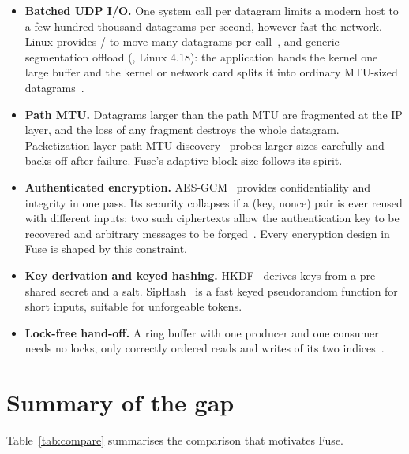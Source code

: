 \begin{itemize}
  \item \textbf{Batched UDP I/O.} One system call per datagram limits a modern host to a few hundred thousand
    datagrams per second, however fast the network. Linux provides / to move many
    datagrams per call~\cite{recvmmsg}, and generic segmentation offload (, Linux 4.18): the
    application hands the kernel one large buffer and the kernel or network card splits it into ordinary
    MTU-sized datagrams~\cite{gso}.
  \item \textbf{Path MTU.} Datagrams larger than the path MTU are fragmented at the IP layer, and the loss of any
    fragment destroys the whole datagram. Packetization-layer path MTU discovery~\cite{rfc8899} probes larger
    sizes carefully and backs off after failure. Fuse's adaptive block size follows its spirit.
  \item \textbf{Authenticated encryption.} AES-GCM~\cite{nist-gcm} provides confidentiality and integrity in one
    pass. Its security collapses if a (key, nonce) pair is ever reused with different inputs: two such
    ciphertexts allow the authentication key to be recovered and arbitrary messages to be
    forged~\cite{joux}. Every encryption design in Fuse is shaped by this constraint.
  \item \textbf{Key derivation and keyed hashing.} HKDF~\cite{rfc5869} derives keys from a pre-shared secret and
    a salt. SipHash~\cite{siphash} is a fast keyed pseudorandom function for short inputs, suitable for
    unforgeable tokens.
  \item \textbf{Lock-free hand-off.} A ring buffer with one producer and one consumer needs no locks, only
    correctly ordered reads and writes of its two indices~\cite{lamport-spsc}.
\end{itemize}

\section{Summary of the gap}

Table~\ref{tab:compare} summarises the comparison that motivates Fuse.

